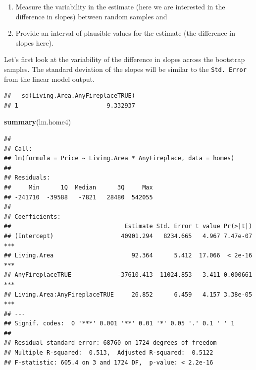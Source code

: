 \documentclass[]{book}
\newenvironment{Shaded}{\begin{snugshade}}{\end{snugshade}}
\newcommand{\CommentTok}[1]{\textcolor[rgb]{0.56,0.35,0.01}{\textit{#1}}}
\newcommand{\KeywordTok}[1]{\textcolor[rgb]{0.13,0.29,0.53}{\textbf{#1}}}
\newcommand{\NormalTok}[1]{#1}
\newcommand{\OperatorTok}[1]{\textcolor[rgb]{0.81,0.36,0.00}{\textbf{#1}}}
\newcommand{\StringTok}[1]{\textcolor[rgb]{0.31,0.60,0.02}{#1}}
\providecommand{\tightlist}{%
  \setlength{\itemsep}{0pt}\setlength{\parskip}{0pt}}
\begin{document}
\begin{enumerate}
\def\labelenumi{\arabic{enumi}.}
\tightlist
\item
  Measure the variability in the estimate (here we are interested in the difference in slopes) between random samples and
\item
  Provide an interval of plausible values for the estimate (the difference in slopes here).
\end{enumerate}

Let's first look at the variability of the difference in slopes across the bootstrap samples. The standard deviation of the slopes will be similar to the \texttt{Std.\ Error} from the linear model output.

\begin{Shaded}
\end{Shaded}

\begin{verbatim}
##   sd(Living.Area.AnyFireplaceTRUE)
## 1                         9.332937
\end{verbatim}

\begin{Shaded}
\begin{Highlighting}[]
\KeywordTok{summary}\NormalTok{(lm.home4)}
\end{Highlighting}
\end{Shaded}

\begin{verbatim}
## 
## Call:
## lm(formula = Price ~ Living.Area * AnyFireplace, data = homes)
## 
## Residuals:
##     Min      1Q  Median      3Q     Max 
## -241710  -39588   -7821   28480  542055 
## 
## Coefficients:
##                                Estimate Std. Error t value Pr(>|t|)    
## (Intercept)                   40901.294   8234.665   4.967 7.47e-07 ***
## Living.Area                      92.364      5.412  17.066  < 2e-16 ***
## AnyFireplaceTRUE             -37610.413  11024.853  -3.411 0.000661 ***
## Living.Area:AnyFireplaceTRUE     26.852      6.459   4.157 3.38e-05 ***
## ---
## Signif. codes:  0 '***' 0.001 '**' 0.01 '*' 0.05 '.' 0.1 ' ' 1
## 
## Residual standard error: 68760 on 1724 degrees of freedom
## Multiple R-squared:  0.513,  Adjusted R-squared:  0.5122 
## F-statistic: 605.4 on 3 and 1724 DF,  p-value: < 2.2e-16
\end{verbatim}
\end{document}
